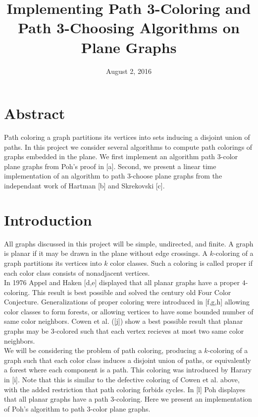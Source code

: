 \documentclass[11pt,letter]{article}
\begin{document}
\title{Implementing Path 3-Coloring and Path 3-Choosing Algorithms on Plane Graphs}
\date{August 2, 2016}

\maketitle

\section*{Abstract}

Path coloring a graph partitions its vertices into sets inducing a disjoint union of paths. In this project
we consider several algorithms to compute path colorings of graphs embedded in the plane. We
first implement an algorithm path 3-color plane graphs from Poh's proof in [a]. Second, we present a linear time
implementation of an algorithm to path 3-choose plane graphs from the independant work of Hartman [b] and
Skrekovski [c].

\section{Introduction}

All graphs discussed in this project will be simple, undirected, and finite. A graph is planar if it may
be drawn in the plane without edge crossings. A $k$-coloring of a graph partitions
its vertices into $k$ color classes. Such a coloring is called proper if each color class consists of
nonadjacent vertices.\\

\noindent In 1976 Appel and Haken [d,e] displayed that all planar graphs have a proper $4$-coloring.
This result is best possible and solved the century old Four Color Conjecture.
Generalizations of proper coloring were introduced in [f,g,h] allowing color classes to form forests, or allowing vertices
to have some bounded number of same color neighbors. Cowen et al. ([j]) show a best possible result that planar
graphs may be $3$-colored such that each vertex recieves at most two same color neighbors.\\

\noindent We will be considering the problem of path coloring, producing a $k$-coloring of a graph such that each color
class induces a disjoint union of paths, or equivalently a forest where each component is a path. This coloring
was introduced by Harary in [i]. Note that this is similar to the defective coloring of Cowen et al. above,
with the added restriction that path coloring forbids cycles. In [l] Poh displayes that all
planar graphs have a path $3$-coloring. Here we present an implementation of Poh's algorithm to path
$3$-color plane graphs.\\
\end{document}
